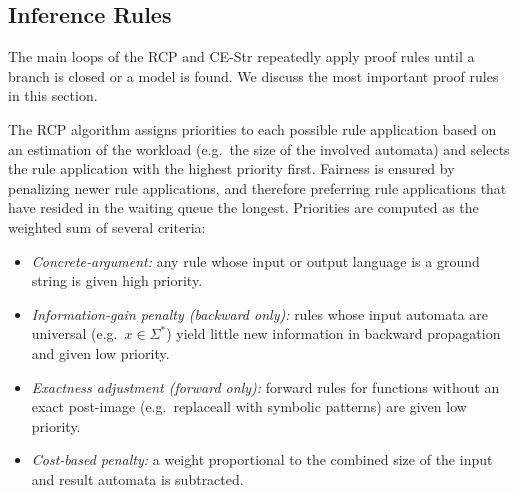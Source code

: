\subsection{Inference Rules}
\label{sec:inference-rules}

The main loops of the RCP and CE-Str repeatedly apply proof rules
until a branch is closed or a model is found. We discuss the most
important proof rules in this section.

The RCP algorithm assigns priorities to each possible rule application based on an estimation of the workload (e.g.\ the size of the involved automata) and selects the rule application with the highest priority first. Fairness is ensured by penalizing newer rule applications, and therefore preferring rule applications that have resided in the waiting queue the longest.
%
Priorities are computed as the weighted sum of several criteria:
%
\begin{itemize}
	\item \emph{Concrete‐argument:} any rule whose input or output language is a ground string is given high priority.
	\item \emph{Information‐gain penalty (backward only):} rules whose input automata are universal (e.g.\ $x\in\Sigma^*$) yield little new information in backward propagation and given low priority.
	\item \emph{Exactness adjustment (forward only):} forward rules for functions without an exact post-image (e.g.\ replaceall with symbolic patterns) are given low priority.
	\item \emph{Cost‐based penalty:} a weight proportional to the combined size of the input and result automata is subtracted.
\end{itemize}

